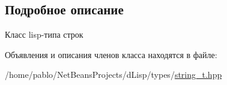 \subsection{Подробное описание}
Класс lisp-\/типа строк 

Объявления и описания членов класса находятся в файле\+:\begin{DoxyCompactItemize}
\item 
/home/pablo/\+Net\+Beans\+Projects/d\+Lisp/types/\mbox{\hyperlink{string__t_8hpp}{string\+\_\+t.\+hpp}}\end{DoxyCompactItemize}

